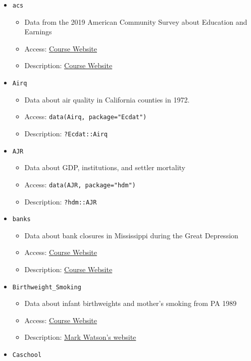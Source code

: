 \documentclass[
  letterpaper,
  DIV=11,
  numbers=noendperiod]{scrreprt}
\begin{document}
\begin{itemize}
\item
  \texttt{acs}

  \begin{itemize}
  \item
    Data from the 2019 American Community Survey about Education and
    Earnings
  \item
    Access: \href{\%60r\%20course_website_link\%60}{Course Website}
  \item
    Description: \href{\%60r\%20course_website_link\%60}{Course Website}
  \end{itemize}
\item
  \texttt{Airq}

  \begin{itemize}
  \item
    Data about air quality in California counties in 1972.
  \item
    Access: \texttt{data(Airq,\ package="Ecdat")}
  \item
    Description: \texttt{?Ecdat::Airq}
  \end{itemize}
\item
  \texttt{AJR}

  \begin{itemize}
  \item
    Data about GDP, institutions, and settler mortality
  \item
    Access: \texttt{data(AJR,\ package="hdm")}
  \item
    Description: \texttt{?hdm::AJR}
  \end{itemize}
\item
  \texttt{banks}

  \begin{itemize}
  \item
    Data about bank closures in Mississippi during the Great Depression
  \item
    Access: \href{\%60r\%20course_website_link\%60}{Course Website}
  \item
    Description: \href{\%60r\%20course_website_link\%60}{Course Website}
  \end{itemize}
\item
  \texttt{Birthweight\_Smoking}

  \begin{itemize}
  \item
    Data about infant birthweights and mother's smoking from PA 1989
  \item
    Access: \href{\%60r\%20course_website_link\%60}{Course Website}
  \item
    Description:
    \href{https://www.princeton.edu/~mwatson/Stock-Watson_3u/Students/EE_Datasets/Birthweight_Smoking_Description.pdf}{Mark
    Watson's website}
  \end{itemize}
\item
  \texttt{Caschool}


\end{itemize}
\end{document}

